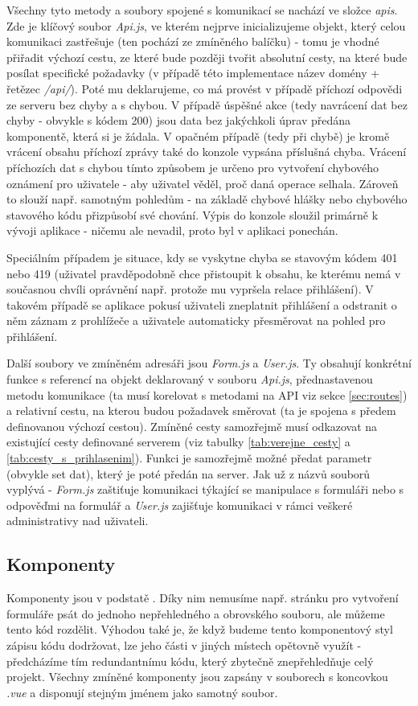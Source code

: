 	Všechny tyto metody a soubory spojené s komunikací se nachází ve složce \textit{apis}. Zde je klíčový soubor \textit{Api.js}, ve kterém nejprve inicializujeme objekt, který celou komunikaci zastřešuje (ten pochází ze zmíněného balíčku) - tomu je vhodné přiřadit výchozí cestu, ze které bude později tvořit absolutní cesty, na které bude posílat specifické požadavky (v případě této implementace název domény + řetězec \textit{/api/}). Poté mu deklarujeme, co má provést v případě příchozí odpovědi ze serveru bez chyby a s chybou. V případě úspěšné akce (tedy navrácení dat bez chyby - obvykle s kódem 200) jsou data bez jakýchkoli úprav předána komponentě, která si je žádala. V opačném případě (tedy při chybě) je kromě vrácení obsahu příchozí zprávy také do konzole vypsána příslušná chyba. Vrácení příchozích dat s chybou tímto způsobem je určeno pro vytvoření chybového oznámení pro uživatele - aby uživatel věděl, proč daná operace selhala. Zároveň to slouží např. samotným pohledům - na základě chybové hlášky nebo chybového stavového kódu přizpůsobí své chování. Výpis do konzole sloužil primárně k vývoji aplikace - ničemu ale nevadil, proto byl v aplikaci ponechán. 
	
	Speciálním případem je situace, kdy se vyskytne chyba se stavovým kódem 401 nebo 419 (uživatel pravděpodobně chce přistoupit k obsahu, ke kterému nemá v současnou chvíli oprávnění např. protože mu vypršela relace přihlášení). V takovém případě se aplikace pokusí uživateli zneplatnit přihlášení a odstranit o něm záznam z prohlížeče a uživatele automaticky přesměrovat na pohled pro přihlášení.
	
	Další soubory ve zmíněném adresáři jsou \textit{Form.js} a \textit{User.js}. Ty obsahují konkrétní funkce s referencí na objekt deklarovaný v souboru \textit{Api.js}, přednastavenou metodu komunikace (ta musí korelovat s metodami na API viz sekce \ref{sec:routes}) a relativní cestu, na kterou budou požadavek směrovat (ta je spojena s předem definovanou výchozí cestou). Zmíněné cesty samozřejmě musí odkazovat na existující cesty definované serverem (viz tabulky \ref{tab:verejne_cesty} a \ref{tab:cesty_s_prihlasenim}). Funkci je samozřejmě možné předat parametr (obvykle set dat), který je poté předán na server. Jak už z názvů souborů vyplývá - \textit{Form.js} zaštiťuje komunikaci týkající se manipulace s formuláři nebo s odpověďmi na formulář a \textit{User.js} zajišťuje komunikaci v rámci veškeré administrativy nad uživateli.
	
	\subsection{Komponenty}\label{sec:komponenty}
	Komponenty jsou v podstatě . Díky nim nemusíme např. stránku pro vytvoření formuláře psát do jednoho nepřehledného a obrovského souboru, ale můžeme tento kód rozdělit. Výhodou také je, že když budeme tento komponentový styl zápisu kódu dodržovat, lze jeho části v jiných místech opětovně využít - předcházíme tím redundantnímu kódu, který zbytečně znepřehledňuje celý projekt. Všechny zmíněné komponenty jsou zapsány v souborech s koncovkou \textit{.vue} a disponují stejným jménem jako samotný soubor.
		
